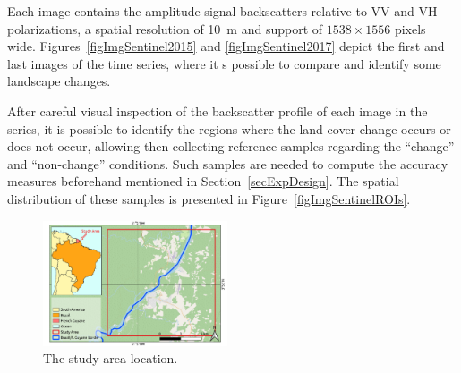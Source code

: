 \documentclass[journal]{IEEEtran}
\begin{document}
Each image contains the amplitude signal backscatters relative to VV and VH polarizations, a spatial resolution of \SI{10}{\meter} and support of $1538 \times 1556$ pixels wide.
Figures~\ref{figImgSentinel2015} and \ref{figImgSentinel2017} depict the first and last images of the time series, where it s possible to compare and identify some landscape changes.

After careful visual inspection of the backscatter profile of each image in the series, it is possible to identify the regions where the land cover change occurs or does not occur, allowing then collecting reference samples regarding the ``change'' and ``non-change'' conditions. 
Such samples are needed to compute the accuracy measures beforehand mentioned in Section~\ref{secExpDesign}. The spatial distribution of these samples is presented in Figure~\ref{figImgSentinelROIs}.


\begin{figure}[hbt]
\centering
\includegraphics[width=0.485\textwidth]{../../qgis/maps/StudyArea_OSM.pdf}
\caption{The study area location.}\label{figAE}
\end{figure}
\end{document}
